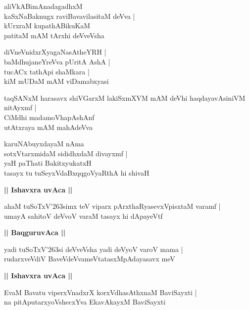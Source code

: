 \documentclass[twoside,12pt,openright]{book}
\def\S{\char'263}
\newcounter{shloka}[chapter]
\def\uvaca#1{\centerline{{\large\textbf{#1}}}}
\begin{document}
\begin{shloka}
aliVkABimAnadagadhxM\\
kaSxNaBaknugx raviBavavilasitaM deVva |\\
kUrxraM kupathABikuKaM \\
patitaM mAM tArxhi deVveVsha
\end{shloka}

\begin{shloka}
diVneVnidxrXyagaNasAtheYRH |\\
baMdhujaneYreVva pUritA AshA |\\
tucACx tathApi shaMkara |\\
kiM mUDaM mAM viDamabxyasi
\end{shloka}

\begin{shloka}
taqSANxM harasavx shiVGarxM lakiSxmXVM mAM deVhi haqdayavAsiniVM nitAyxmf |\\
CiMdhi madamoVhapAshAnf \\
utAtxraya mAM mahAdeVva
\end{shloka}


\begin{shloka}
karuNAbuyxdayaM nAma \\
sotxVtarxmidaM sididhxdaM divayxmf |\\
yaH paThati BakitxyukatxH \\
tasayx tu tuSeyxVdaBxqqgoVyaRthA hi shivaH 
\end{shloka}

\uvaca{|| Ishavxra uvAca ||}

\begin{shloka}
ahaM tuSoTxV\S simx teV viparx pArxthaRyasevxVpisxtaM varamf |\\
umayA sahitoV deVvoV varaM tasayx hi dApayeVtf 
\end{shloka}

\uvaca{|| BaqguruvAca ||}

\begin{shloka}
yadi tuSoTxV\S si deVveVsha yadi deVyoV varoV mama |\\
rudarxveVdiV BaveVdeVvameVtatasxMpAdayasavx meV 
\end{shloka}

\uvaca{|| Ishavxra uvAca ||}

\begin{shloka}
EvaM Bavatu viperxVnadxrX korxVdhasAthxnaM BaviSayxti |\\
na pitAputarxyoVshecxYva EkavAkayxM BaviSayxti
\end{shloka}
\end{document}

